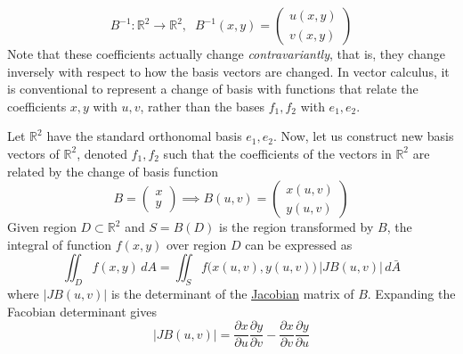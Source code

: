   \begin{equation}
    B^{-1}: \mathbb{R}^2 \to \mathbb{R}^2, \;\; B^{-1} (x, y) = \begin{pmatrix} u (x, y) \\ v (x, y) \end{pmatrix}
  \end{equation}
  Note that these coefficients actually change \textit{contravariantly}, that is, they change inversely with respect to how the basis vectors are changed. In vector calculus, it is conventional to represent a change of basis with functions that relate the coefficients $x, y$ with $u, v$, rather than the bases $f_1, f_2$ with $e_1, e_2$. 

  \begin{theorem}
    \label{thm:integration-over-change-of-bases-in-r2}
  Let $\mathbb{R}^2$ have the standard orthonomal basis $e_1, e_2$. Now, let us construct new basis vectors of $\mathbb{R}^2$, denoted $f_1, f_2$ such that the coefficients of the vectors in $\mathbb{R}^2$ are related by the change of basis function 
  \begin{equation}
    B = \begin{pmatrix} x \\ y \end{pmatrix} \implies B(u, v) = \begin{pmatrix} x(u, v) \\ y(u, v) \end{pmatrix}
  \end{equation}
  Given region $D \subset \mathbb{R}^2$ and $S = B(D)$ is the region transformed by $B$, the integral of function $f(x, y)$ over region $D$ can be expressed as 
  \begin{equation}
    \iint_D f(x, y) \, dA = \iint_S f \big( x(u, v), y(u, v) \big) \, \big| J B(u, v) \big| \, d \bar{A}
  \end{equation}
  where $\big| J B(u, v) \big|$ is the determinant of the \hyperref[def:jacobian]{Jacobian} matrix of $B$. Expanding the Facobian determinant gives
  \begin{equation}
    \big| J B(u, v) \big| = \frac{\partial x}{\partial u} \frac{\partial y}{\partial v} - \frac{\partial x}{\partial v} \frac{\partial y}{\partial u}
  \end{equation}
  \end{theorem}

